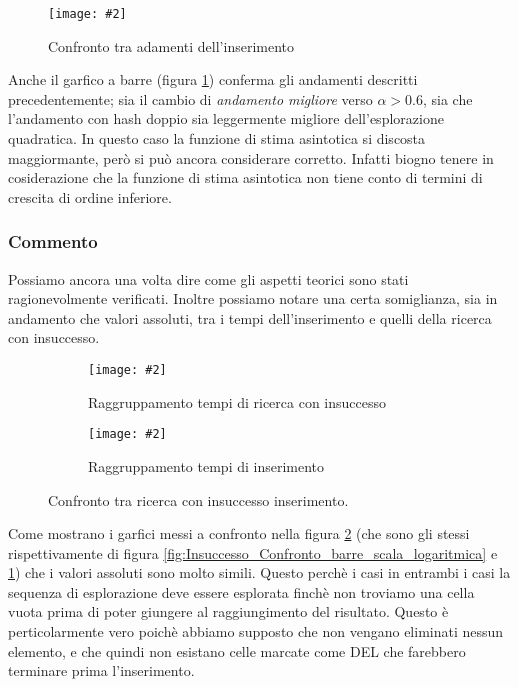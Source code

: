 \documentclass{article}
\newcommand{\image}[3][1]{
	\centering
	\texttt{[image: \#2]}
	\caption{#3}
}
\begin{document}
\begin{figure}[H]
\image[0.75]{Inserimento_Confronto_barre_scala_logaritmica}{Confronto tra adamenti dell'inserimento}
\label{fig:Inserimento_Confronto_barre_scala_logaritmica}
\end{figure}

Anche il garfico a barre (figura \ref{fig:Inserimento_Confronto_barre_scala_logaritmica}) conferma gli andamenti descritti precedentemente; sia il cambio di \emph{andamento migliore} verso $\alpha > 0.6$, sia che l'andamento con hash doppio sia leggermente migliore dell'esplorazione quadratica. In questo caso la funzione di stima asintotica si discosta maggiormante, però si può ancora considerare corretto. Infatti biogno tenere in cosiderazione che la funzione di stima asintotica non tiene conto di termini di crescita di ordine inferiore.

\subsubsection{Commento}

Possiamo ancora una volta dire come gli aspetti teorici sono stati ragionevolmente verificati. Inoltre possiamo notare una certa somiglianza, sia in andamento che valori assoluti, tra i tempi dell'inserimento e quelli della ricerca con insuccesso.

\begin{figure}[H]
\begin{subfigure}[b]{0.5\textwidth}
\image{Insuccesso_Confronto_barre_scala_logaritmica}{Raggruppamento tempi di ricerca con insuccesso}
\end{subfigure}
\begin{subfigure}[b]{0.5\textwidth}
\image{Inserimento_Confronto_barre_scala_logaritmica}{Raggruppamento tempi di inserimento}
\end{subfigure}
\caption{Confronto tra ricerca con insuccesso inserimento.}
\label{fig:Confronto_ricerca_insuccesso}
\end{figure}

Come mostrano i garfici messi a confronto nella figura \ref{fig:Confronto_ricerca_insuccesso} (che sono gli stessi rispettivamente di figura \ref{fig:Insuccesso_Confronto_barre_scala_logaritmica} e \ref{fig:Inserimento_Confronto_barre_scala_logaritmica}) che i valori assoluti sono molto simili. Questo perchè i casi in entrambi i casi la sequenza di esplorazione deve essere esplorata finchè non troviamo una cella vuota prima di poter giungere al raggiungimento del risultato. Questo è perticolarmente vero poichè abbiamo supposto che non vengano eliminati nessun elemento, e che quindi non esistano celle marcate come DEL che farebbero terminare prima l'inserimento.
\end{document}
